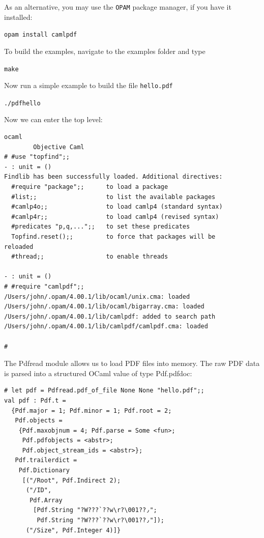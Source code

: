 \documentclass[a4paper]{memoir}
\begin{document}
\noindent As an alternative, you may use the \texttt{OPAM} package manager, if you have it installed:
\begin{framed}
\verb!opam install camlpdf!
\end{framed}

\noindent To build the examples, navigate to the examples folder and type
\begin{framed}
\verb!make!
\end{framed}
\noindent Now run a simple example to build the file \verb!hello.pdf!
\begin{framed}
\verb!./pdfhello!
\end{framed}
\noindent Now we can enter the top level:
\begin{framed}
\begin{verbatim}
ocaml
        Objective Caml
# #use "topfind";;
- : unit = ()
Findlib has been successfully loaded. Additional directives:
  #require "package";;      to load a package
  #list;;                   to list the available packages
  #camlp4o;;                to load camlp4 (standard syntax)
  #camlp4r;;                to load camlp4 (revised syntax)
  #predicates "p,q,...";;   to set these predicates
  Topfind.reset();;         to force that packages will be
reloaded
  #thread;;                 to enable threads

- : unit = ()
# #require "camlpdf";;
/Users/john/.opam/4.00.1/lib/ocaml/unix.cma: loaded
/Users/john/.opam/4.00.1/lib/ocaml/bigarray.cma: loaded
/Users/john/.opam/4.00.1/lib/camlpdf: added to search path
/Users/john/.opam/4.00.1/lib/camlpdf/camlpdf.cma: loaded

#
\end{verbatim}
\end{framed}
\noindent The \textsf{Pdfread} module allows us to load PDF files into memory. The raw PDF data is parsed into a structured OCaml value of type \textsf{Pdf.pdfdoc}:
\begin{framed}
\begin{verbatim}
# let pdf = Pdfread.pdf_of_file None None "hello.pdf";;
val pdf : Pdf.t =
  {Pdf.major = 1; Pdf.minor = 1; Pdf.root = 2;
   Pdf.objects =
    {Pdf.maxobjnum = 4; Pdf.parse = Some <fun>;
     Pdf.pdfobjects = <abstr>;
     Pdf.object_stream_ids = <abstr>};
   Pdf.trailerdict =
    Pdf.Dictionary
     [("/Root", Pdf.Indirect 2);
      ("/ID",
       Pdf.Array
        [Pdf.String "?W???`??w\r?\001??٫";
         Pdf.String "?W???`??w\r?\001??٫"]);
      ("/Size", Pdf.Integer 4)]}
\end{verbatim}
\end{framed}
\end{document}
